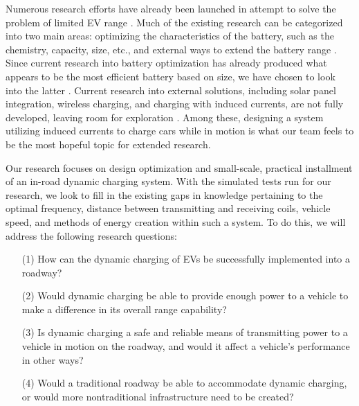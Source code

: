 Numerous research efforts have already been launched in attempt to solve the problem of limited EV range 
\cite{panchal_review_2018}. Much of the existing research can be categorized into two main areas: optimizing 
the characteristics of the battery, such as the chemistry, capacity, size, etc., and external ways to 
extend the battery range \cite{lukic_cutting_2013}. Since current research into battery optimization has 
already produced what appears to be the most efficient battery based on size, we have chosen to look into 
the latter \cite{lukic_cutting_2013}.  Current research into external solutions, including solar panel 
integration, wireless charging, and charging with induced currents, are not fully developed, leaving 
room for exploration \cite{parmesh_wireless_2017}. Among these, designing a system utilizing induced currents 
to charge cars while in motion is what our team feels to be the most hopeful topic for extended research.

Our research focuses on design optimization and small-scale, practical installment of an in-road dynamic 
charging system. With the simulated tests run for our research, we look to fill in the existing gaps in 
knowledge pertaining to the optimal frequency, distance between transmitting and receiving coils, vehicle 
speed, and methods of energy creation within such a system. To do this, we will address the following 
research questions: 
\begin{enumerate}
    \item[(1)]
    How can the dynamic charging of EVs be successfully implemented into a roadway?  
    \item[(2)]
    Would dynamic charging be able to provide enough power to a vehicle to make a difference in its overall range capability? 
    \item[(3)]
    Is dynamic charging a safe and reliable means of transmitting power to a vehicle in motion on the roadway, and would it affect a vehicle’s performance in other ways?   
    \item[(4)]
    Would a traditional roadway be able to accommodate dynamic charging, or would more nontraditional infrastructure need to be created?
\end{enumerate}